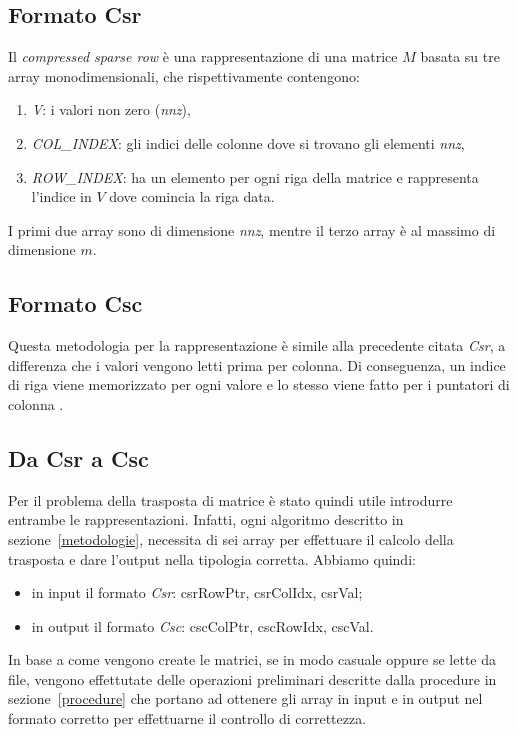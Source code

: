 \documentclass[]{IEEEtran}
\begin{document}
	\subsection{Formato Csr}
	\label{csr}
	Il \textit{compressed sparse row} è una rappresentazione di una matrice $ M $ basata su tre array monodimensionali, che rispettivamente contengono:
	\begin{enumerate}
		\item \textit{V}: i valori non zero (\textit{nnz}),
		\item \textit{COL\_INDEX}: gli indici delle colonne dove si trovano gli elementi \textit{nnz},
		\item \textit{ROW\_INDEX}: ha un elemento per ogni riga della matrice e rappresenta l'indice in $ V $ dove comincia la riga data.
	\end{enumerate}
	I primi due array sono di dimensione \textit{nnz}, mentre il terzo array è al massimo di dimensione $ m $.
	
	\subsection{Formato Csc}
	\label{csc}
 	Questa metodologia per la rappresentazione è simile alla precedente citata \textit{Csr}, a differenza che i valori vengono letti prima per colonna. Di conseguenza, un indice di riga viene memorizzato per ogni valore e lo stesso viene fatto per i puntatori di colonna .
 	
	\subsection{Da Csr a Csc}
	\label{csr-to-csc}
 	Per il problema della trasposta di matrice è stato quindi utile introdurre entrambe le rappresentazioni. Infatti, ogni algoritmo  descritto in sezione~\ref{metodologie}, necessita di sei array per effettuare il calcolo della trasposta e dare l'output nella tipologia corretta. Abbiamo quindi:
 	\begin{itemize}
 		\item in input il formato \textit{Csr}: csrRowPtr, csrColIdx, csrVal;
 		\item in output il formato \textit{Csc}: cscColPtr, cscRowIdx, cscVal.	
 	\end{itemize}
 	In base a come vengono create le matrici, se in modo casuale oppure se lette da file, vengono effettutate delle operazioni preliminari descritte dalla procedure in sezione~\ref{procedure} che portano ad ottenere gli array in input e in output nel formato corretto per effettuarne il controllo di correttezza.\newline
	
\end{document}

